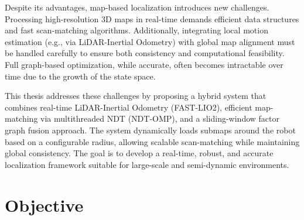 Despite its advantages, map-based localization introduces new challenges. Processing high-resolution 3D maps in real-time demands efficient data structures and fast scan-matching algorithms. Additionally, integrating local motion estimation (e.g., via LiDAR-Inertial Odometry) with global map alignment must be handled carefully to ensure both consistency and computational feasibility. Full graph-based optimization, while accurate, often becomes intractable over time due to the growth of the state space.

This thesis addresses these challenges by proposing a hybrid system that combines real-time LiDAR-Inertial Odometry (FAST-LIO2), efficient map-matching via multithreaded NDT (NDT-OMP), and a sliding-window factor graph fusion approach. The system dynamically loads submaps around the robot based on a configurable radius, allowing scalable scan-matching while maintaining global consistency. The goal is to develop a real-time, robust, and accurate localization framework suitable for large-scale and semi-dynamic environments.

\section{Objective}

